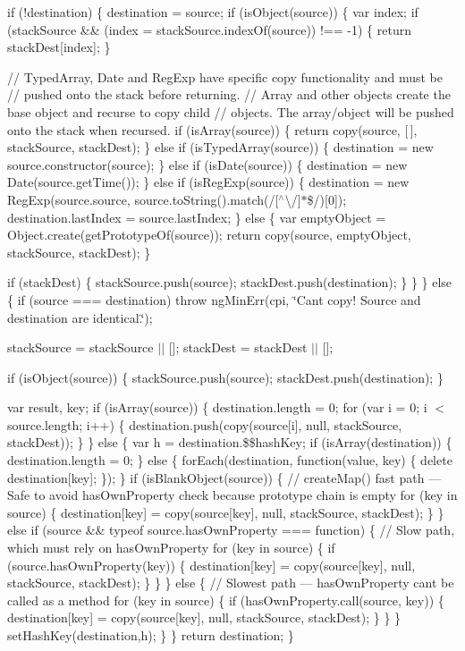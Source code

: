 if (!destination) \{ destination = source; if (is\+Object(source)) \{ var index; if (stack\+Source \&\& (index = stack\+Source.\+index\+Of(source)) !== -\/1) \{ return stack\+Dest\mbox{[}index\mbox{]}; \}

// Typed\+Array, Date and Reg\+Exp have specific copy functionality and must be // pushed onto the stack before returning. // Array and other objects create the base object and recurse to copy child // objects. The array/object will be pushed onto the stack when recursed. if (is\+Array(source)) \{ return copy(source, \mbox{[}$\,$\mbox{]}, stack\+Source, stack\+Dest); \} else if (is\+Typed\+Array(source)) \{ destination = new source.\+constructor(source); \} else if (is\+Date(source)) \{ destination = new Date(source.\+get\+Time()); \} else if (is\+Reg\+Exp(source)) \{ destination = new Reg\+Exp(source.\+source, source.\+to\+String().match(/\mbox{[}$^\wedge$\textbackslash{}/\mbox{]}$\ast$\$/)\mbox{[}0\mbox{]}); destination.\+last\+Index = source.\+last\+Index; \} else \{ var empty\+Object = Object.\+create(get\+Prototype\+Of(source)); return copy(source, empty\+Object, stack\+Source, stack\+Dest); \}

if (stack\+Dest) \{ stack\+Source.\+push(source); stack\+Dest.\+push(destination); \} \} \} else \{ if (source === destination) throw ng\+Min\+Err(\textquotesingle{}cpi\textquotesingle{}, \char`\"{}\+Can\textquotesingle{}t copy! Source and destination are identical.\char`\"{});

stack\+Source = stack\+Source $\vert$$\vert$ \mbox{[}\mbox{]}; stack\+Dest = stack\+Dest $\vert$$\vert$ \mbox{[}\mbox{]};

if (is\+Object(source)) \{ stack\+Source.\+push(source); stack\+Dest.\+push(destination); \}

var result, key; if (is\+Array(source)) \{ destination.\+length = 0; for (var i = 0; i $<$ source.\+length; i++) \{ destination.\+push(copy(source\mbox{[}i\mbox{]}, null, stack\+Source, stack\+Dest)); \} \} else \{ var h = destination.\$\$hash\+Key; if (is\+Array(destination)) \{ destination.\+length = 0; \} else \{ for\+Each(destination, function(value, key) \{ delete destination\mbox{[}key\mbox{]}; \}); \} if (is\+Blank\+Object(source)) \{ // create\+Map() fast path --- Safe to avoid has\+Own\+Property check because prototype chain is empty for (key in source) \{ destination\mbox{[}key\mbox{]} = copy(source\mbox{[}key\mbox{]}, null, stack\+Source, stack\+Dest); \} \} else if (source \&\& typeof source.\+has\+Own\+Property === \textquotesingle{}function\textquotesingle{}) \{ // Slow path, which must rely on has\+Own\+Property for (key in source) \{ if (source.\+has\+Own\+Property(key)) \{ destination\mbox{[}key\mbox{]} = copy(source\mbox{[}key\mbox{]}, null, stack\+Source, stack\+Dest); \} \} \} else \{ // Slowest path --- has\+Own\+Property can\textquotesingle{}t be called as a method for (key in source) \{ if (has\+Own\+Property.\+call(source, key)) \{ destination\mbox{[}key\mbox{]} = copy(source\mbox{[}key\mbox{]}, null, stack\+Source, stack\+Dest); \} \} \} set\+Hash\+Key(destination,h); \} \} return destination; \}


